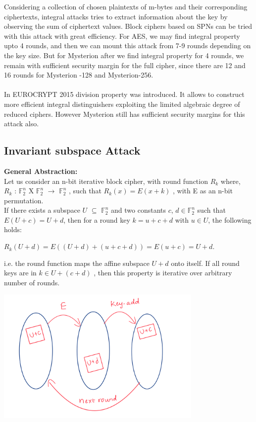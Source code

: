 \documentclass[preprint]{transcrypto}
\begin{document}
Considering a collection of chosen plaintexts of m-bytes and their corresponding ciphertexts, integral attacks tries to extract information about the key by observing the sum of ciphertext values. Block ciphers based on SPNs can be tried with this attack with great efficiency. For AES, we may find integral property upto 4 rounds, and then we can mount this attack from 7-9 rounds depending on the key size. But for Mysterion after we find integral property for 4 rounds, we remain with sufficient security margin for the full cipher, since there are 12 and 16 rounds for Mysterion -128 and Mysterion-256. 
\\\\
In EUROCRYPT 2015 division property was introduced. It allows to construct more efficient integral distinguishers exploiting the limited algebraic degree of reduced ciphers. However Mysterion still has sufficient security margins for this attack also.

\subsection{Invariant subspace Attack}
\textbf{General Abstraction:} \\
Let us consider an n-bit iterative block cipher, with round function $R_k$ where,\\
$R_k$ : $\mathbb{F}_2^n$ X $\mathbb{F}_2^n$ $\rightarrow$ $\mathbb{F}_2^n$ , such that $R_k (x) = E(x + k)$ , with E as an n-bit permutation.\\
If there exists a subspace $U$ $\subseteq$ $\mathbb{F}_2^n $ and two constants $c$, $d \in \mathbb{F}_2^n$ such that $E(U + c) = U + d$, then for a round key $k = u + c + d$ with $u \in U$, the following holds:
\begin{center}
    $R_k(U + d) = E((U + d) + (u + c + d)) = E(u + c) = U + d$.
\end{center}
i.e. the round function maps the affine subspace $U + d$ onto itself. If all round
keys are in $k \in U + (c + d)$ , then this property is iterative over arbitrary number of rounds.\\

\begin{center}
    \includegraphics[width=10cm]{ISA.png}
\end{center}
\end{document}

